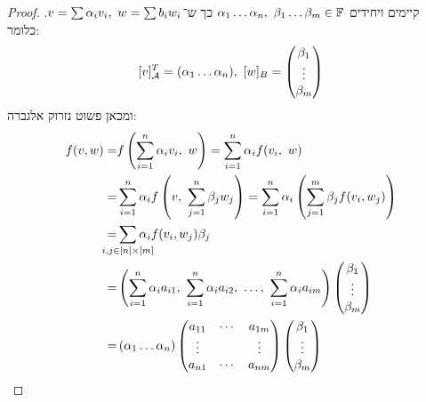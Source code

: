 \documentclass[name=רשימות אלגברה לינארית 2א]{../../../tex/classes/megasumPreamble}
\begin{document}
	\begin{proof}
		
		קיימים ויחידים $\alpha_1 \dots \alpha_n, \ \beta_1 \dots \beta_m \in \mathbb{F}$ כך ש־$v = \sum \alpha_i v_i, \ w = \sum b_iw_i$. 
		כלומר: 
		\[ [v]_\ac^T = (\ag_1 \dots \ag_n), \ [w]_B = \pms{\bg_1 \\ \vdots \\ \bg_m} \]
		ומכאן פשוט נזרוק אלגברה: 
		\begin{align*}
			f(v, w) = &f\cl{\sum_{i = 1}^{n}\ag_i v_i, \ w} = \sum_{i = 1}^{n}\ag_i f(v_i, \ w) \\
			= &\sum_{i = 1}^{n}\ag_i f\cl{v, \ \sum_{j = 1}^{n}\bg_j w_j} = \sum_{i = 1}^{n}\ag_i \cl{\sum_{j = 1}^{m}\bg_j f(v_i, w_j)} \\
			= &\sum_{\mathclap{i, j \in [n] \times [m]}} \ag_i f(v_i, w_j)\bg_j \\
			= &\cl{\sum_{i = 1}^{n}\ag_i a_{i1}, \ \sum_{i = 1}^{n}\ag_i a_{i2}, \ \dots, \ \sum_{i = 1}^{n}\ag_i a_{im}}\pms{\bg_1 \\ \vdots \\ \bg_m} \\
			= &\,(\ag_1 \dots \ag_n)\pms{a_{11} &\cdots &a_{1m} \\ \vdots && \vdots \\ a_{n1} & \cdots & a_{nm}}\pms{\bg_1 \\ \vdots \\ \bg_{m}} 
		\end{align*}
	\end{proof}
	
\end{document}

